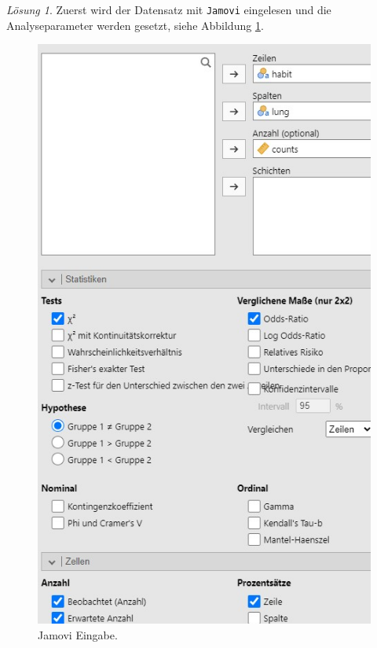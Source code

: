 \documentclass[
]{book}
\theoremstyle{definition}
\theoremstyle{definition}
\theoremstyle{definition}
\theoremstyle{definition}
\theoremstyle{remark}
\newtheorem*{solution}{Lösung}
\begin{document}
\begin{solution}

Zuerst wird der Datensatz mit \texttt{Jamovi} eingelesen und die
Analyseparameter werden gesetzt, siehe Abbildung
\ref{fig:sol-cancer-smoking-input}.

\begin{figure}

{\centering \includegraphics{figures/09-exr-cancer-smoking-jmv-input} 

}

\caption{Jamovi Eingabe.}\label{fig:sol-cancer-smoking-input}
\end{figure}


\end{solution}
\end{document}
